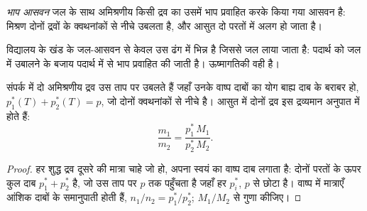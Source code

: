 \begin{definition}[भाप आसवन]\label{def:b2:liquid-vapour-diagrams:steam-distillation}
\emph{भाप आसवन} जल के साथ अमिश्रणीय किसी
द्रव का उसमें भाप प्रवाहित करके किया गया आसवन है: मिश्रण दोनों द्रवों के
क्वथनांकों से नीचे उबलता है, और आसुत
दो परतों में अलग हो जाता है।
\end{definition}

 विद्यालय के खंड के जल-आसवन से केवल उस ढंग में भिन्न है
जिससे जल लाया जाता है: पदार्थ को जल में उबालने के बजाय पदार्थ में से
भाप प्रवाहित की जाती है। ऊष्मागतिकी वही है।

\begin{proposition}[दो अमिश्रणीय द्रवों का क्वथन]\label{prop:b2:liquid-vapour-diagrams:steam}
संपर्क में दो अमिश्रणीय द्रव उस ताप पर उबलते हैं जहाँ उनके
वाष्प दाबों का योग बाह्य दाब के बराबर हो, $p_1^*(T) + p_2^*(T) =
p$, जो दोनों क्वथनांकों से नीचे है। आसुत में दोनों द्रव
इस द्रव्यमान अनुपात में होते हैं:
\[
  \frac{m_1}{m_2} = \frac{p_1^*\,M_1}{p_2^*\,M_2} .
\]
\end{proposition}

\begin{proof}
हर शुद्ध द्रव दूसरे की मात्रा चाहे जो हो, अपना स्वयं का वाष्प दाब लगाता है:
दोनों परतों के ऊपर कुल दाब $p_1^* + p_2^*$ है, जो
उस ताप पर $p$ तक पहुँचता है जहाँ हर $p_i^*$, $p$ से छोटा है। वाष्प में
मात्राएँ आंशिक दाबों के समानुपाती होती हैं, $n_1/n_2 =
p_1^*/p_2^*$; $M_1/M_2$ से गुणा कीजिए।
\end{proof}

